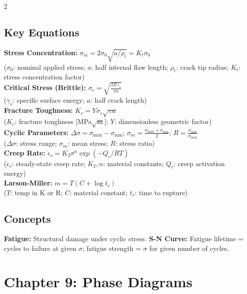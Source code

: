\documentclass[8pt]{extarticle}
\begin{document}
\begin{multicols*}{2}
\subsection*{Key Equations}
\textbf{Stress Concentration:} $\sigma_m = 2\sigma_0\sqrt{a/\rho_t} = K_t\sigma_0$ \\
($\sigma_0$: nominal applied stress; $a$: half internal flaw length; $\rho_t$: crack tip radius; $K_t$: stress concentration factor) \\
\textbf{Critical Stress (Brittle):} $\sigma_c = \sqrt{\frac{2E\gamma_s}{\pi a}}$ \\
($\gamma_s$: specific surface energy; $a$: half crack length) \\
\textbf{Fracture Toughness:} $K_c = Y\sigma_c\sqrt{\pi a}$ \\
($K_c$: fracture toughness [MPa$\sqrt{\text{m}}$]; $Y$: dimensionless geometric factor) \\
\textbf{Cyclic Parameters:} $\Delta\sigma=\sigma_{\max}-\sigma_{\min}$; \; $\sigma_m=\frac{\sigma_{\max}+\sigma_{\min}}{2}$; \; $R=\frac{\sigma_{\min}}{\sigma_{\max}}$ \\
($\Delta\sigma$: stress range; $\sigma_m$: mean stress; $R$: stress ratio) \\
\textbf{Creep Rate:} $\dot{\epsilon}_s = K_2\sigma^n\exp(-Q_c/RT)$ \\
($\dot{\epsilon}_s$: steady-state creep rate; $K_2,n$: material constants; $Q_c$: creep activation energy) \\
\textbf{Larson-Miller:} $m=T(C+\log t_r)$ \\
($T$: temp in K or R; $C$: material constant; $t_r$: time to rupture)
\subsection*{Concepts}
\textbf{Fatigue:} Structural damage under cyclic stress. \textbf{S-N Curve:} Fatigue lifetime = cycles to failure at given $\sigma$; fatigue strength = $\sigma$ for given number of cycles.

\section*{Chapter 9: Phase Diagrams}

\end{multicols*}
\end{document}
